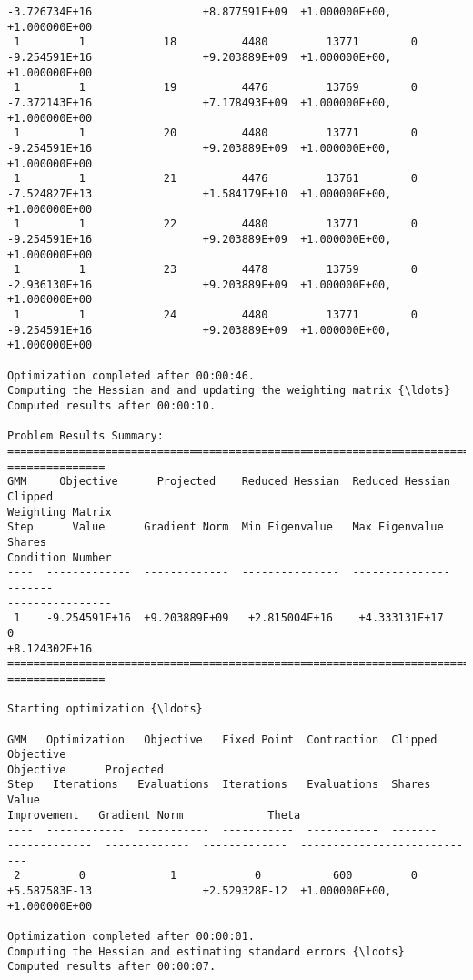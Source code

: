 \begin{Verbatim}[commandchars=\\\{\}]
-3.726734E+16                 +8.877591E+09  +1.000000E+00, +1.000000E+00
 1         1            18          4480         13771        0
-9.254591E+16                 +9.203889E+09  +1.000000E+00, +1.000000E+00
 1         1            19          4476         13769        0
-7.372143E+16                 +7.178493E+09  +1.000000E+00, +1.000000E+00
 1         1            20          4480         13771        0
-9.254591E+16                 +9.203889E+09  +1.000000E+00, +1.000000E+00
 1         1            21          4476         13761        0
-7.524827E+13                 +1.584179E+10  +1.000000E+00, +1.000000E+00
 1         1            22          4480         13771        0
-9.254591E+16                 +9.203889E+09  +1.000000E+00, +1.000000E+00
 1         1            23          4478         13759        0
-2.936130E+16                 +9.203889E+09  +1.000000E+00, +1.000000E+00
 1         1            24          4480         13771        0
-9.254591E+16                 +9.203889E+09  +1.000000E+00, +1.000000E+00

Optimization completed after 00:00:46.
Computing the Hessian and and updating the weighting matrix {\ldots}
Computed results after 00:00:10.

Problem Results Summary:
================================================================================
===============
GMM     Objective      Projected    Reduced Hessian  Reduced Hessian  Clipped
Weighting Matrix
Step      Value      Gradient Norm  Min Eigenvalue   Max Eigenvalue   Shares
Condition Number
----  -------------  -------------  ---------------  ---------------  -------
----------------
 1    -9.254591E+16  +9.203889E+09   +2.815004E+16    +4.333131E+17      0
+8.124302E+16
================================================================================
===============

Starting optimization {\ldots}

GMM   Optimization   Objective   Fixed Point  Contraction  Clipped    Objective
Objective      Projected
Step   Iterations   Evaluations  Iterations   Evaluations  Shares       Value
Improvement   Gradient Norm             Theta
----  ------------  -----------  -----------  -----------  -------
-------------  -------------  -------------  ----------------------------
 2         0             1            0           600         0
+5.587583E-13                 +2.529328E-12  +1.000000E+00, +1.000000E+00

Optimization completed after 00:00:01.
Computing the Hessian and estimating standard errors {\ldots}
Computed results after 00:00:07.


\end{Verbatim}

